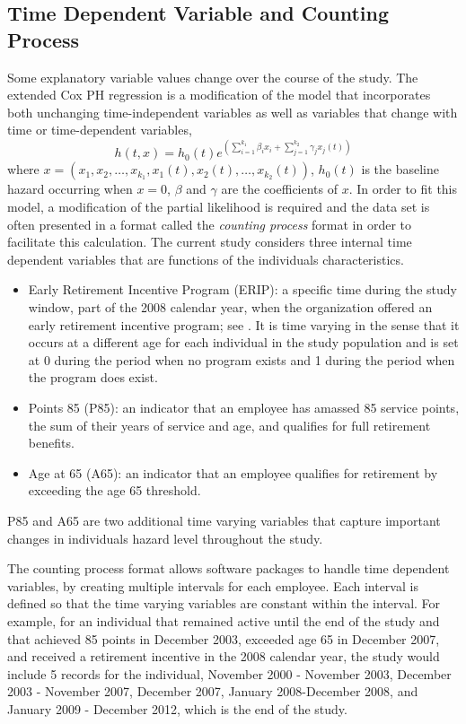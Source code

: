 \subsection{Time Dependent Variable and Counting Process}
\label{sec:coxt}
Some explanatory variable values change over the course of the study. The extended Cox PH regression is a modification of the model that incorporates both unchanging time-independent variables as well as variables that change with time or time-dependent variables,
\begin{equation}
\label{eq:timecovar}
h(t,x)=h_0(t)e^{(\sum_{i=1}^{k_1}\beta_ix_i+\sum_{j=1}^{k_2}\gamma_jx_j(t))}
\end{equation}
where $x=(x_1, x_2, \ldots, x_{k_1}, x_1(t), x_2(t), \ldots, x_{k_2}(t))$, $h_0(t)$ is the baseline hazard occurring when $x=0$, $\beta$ and $\gamma$ are the coefficients of $x$. In order to fit this model, a modification of the partial likelihood is required and the data set is often presented in a format called the {\it counting process} format in order to facilitate this calculation. The current study considers three internal time dependent variables that are functions of the individuals characteristics.
\begin{itemize}
	\item Early Retirement Incentive Program (ERIP): a specific time during the study window, part of the 2008 calendar year, when the organization offered an early retirement incentive program; see \citep{ERIP}. It is time varying in the sense that it occurs at a different age for each individual in the study population and is set at 0 during the period when no program exists and 1 during the period when the program does exist.
	\item Points 85 (P85): an indicator that an employee has amassed 85 service points, the sum of their years of service and age, and qualifies for full retirement benefits.
	\item Age at 65 (A65): an indicator that an employee qualifies for retirement by exceeding the age 65 threshold.
\end{itemize}
P85 and A65 are two additional time varying variables that capture important changes in individuals hazard level throughout the study.

The counting process format allows software packages to handle time dependent variables, by creating multiple intervals for each employee.  Each interval is defined so that the time varying variables are constant within the interval.
For example, for an individual that remained active until the end of the study and that achieved 85 points in December 2003, exceeded age 65 in December 2007, and received a retirement incentive in the 2008 calendar year, the study would include 5 records for the individual, November 2000 - November 2003, December 2003 - November 2007, December 2007, January 2008-December 2008, and January 2009 - December 2012, which is the end of the study.

